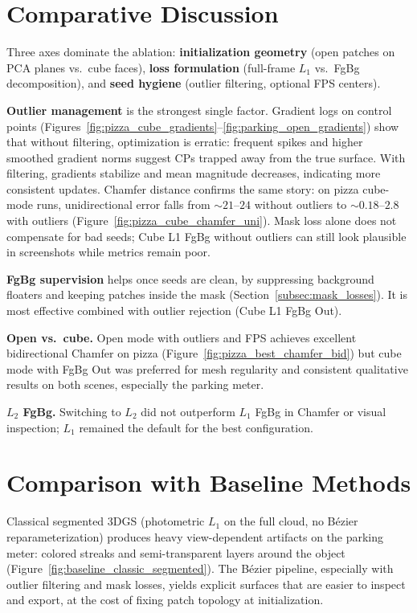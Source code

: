 \documentclass{report}
\begin{document}
\section{Comparative Discussion}
\label{sec:results_comparative}

Three axes dominate the ablation: \textbf{initialization geometry} (open patches on PCA planes vs.\ cube faces), \textbf{loss formulation} (full-frame $L_1$ vs.\ FgBg decomposition), and \textbf{seed hygiene} (outlier filtering, optional FPS centers).

\textbf{Outlier management} is the strongest single factor. Gradient logs on control points (Figures~\ref{fig:pizza_cube_gradients}--\ref{fig:parking_open_gradients}) show that without filtering, optimization is erratic: frequent spikes and higher smoothed gradient norms suggest CPs trapped away from the true surface. With filtering, gradients stabilize and mean magnitude decreases, indicating more consistent updates. Chamfer distance confirms the same story: on pizza cube-mode runs, unidirectional error falls from $\sim 21$--$24$ without outliers to $\sim 0.18$--$2.8$ with outliers (Figure~\ref{fig:pizza_cube_chamfer_uni}). Mask loss alone does not compensate for bad seeds; Cube L1 FgBg without outliers can still look plausible in screenshots while metrics remain poor.

\textbf{FgBg supervision} helps once seeds are clean, by suppressing background floaters and keeping patches inside the mask (Section~\ref{subsec:mask_losses}). It is most effective combined with outlier rejection (Cube L1 FgBg Out).

\textbf{Open vs.\ cube.} Open mode with outliers and FPS achieves excellent bidirectional Chamfer on pizza (Figure~\ref{fig:pizza_best_chamfer_bid}) but cube mode with FgBg Out was preferred for mesh regularity and consistent qualitative results on both scenes, especially the parking meter.

\textbf{$L_2$ FgBg.} Switching to $L_2$ did not outperform $L_1$ FgBg in Chamfer or visual inspection; $L_1$ remained the default for the best configuration.

\section{Comparison with Baseline Methods}
\label{sec:results_baseline_compare}

Classical segmented 3DGS (photometric $L_1$ on the full cloud, no B\'ezier reparameterization) produces heavy view-dependent artifacts on the parking meter: colored streaks and semi-transparent layers around the object (Figure~\ref{fig:baseline_classic_segmented}). The B\'ezier pipeline, especially with outlier filtering and mask losses, yields explicit surfaces that are easier to inspect and export, at the cost of fixing patch topology at initialization.
\end{document}
